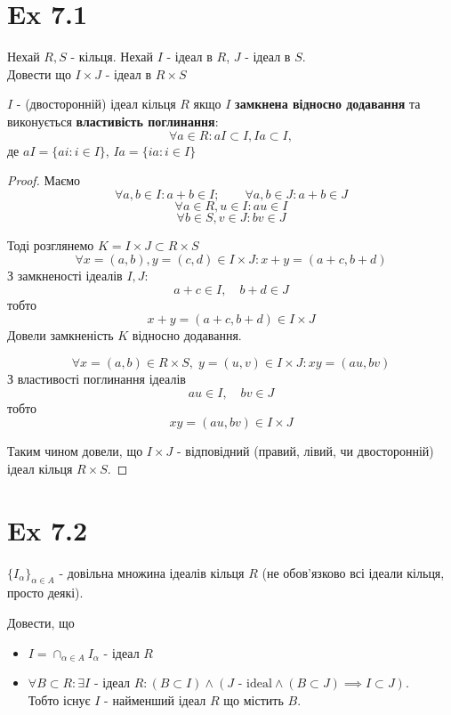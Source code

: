 \documentclass[11pt, a4paper]{article} %
\begin{document}
\section*{Ex 7.1}
\begin{mdframed}
Нехай $R,S$ - кільця. Нехай $I$ - ідеал в $R$, $J$ - ідеал в $S$.\\
Довести що $I \times J$ - ідеал в $R \times S$
\end{mdframed}

\begin{mdframed}[backgroundcolor=blue!10]
    $I$ - (двосторонній) ідеал кільця $R$ якщо $I$ \textbf{замкнена 
    відносно додавання} та виконується \textbf{властивість поглинання}:
    \[\forall a \in R: aI \subset I, Ia \subset I,\]
    де $aI = \{ai : i\in I\}$, $Ia = \{ia : i\in I\}$
\end{mdframed}

\begin{proof}
    Маємо 
    \[\forall a,b \in I: a+b \in I; \qquad \forall a,b \in J: a+b \in J\]
    \[\forall a\in R, u\in I: au \in I\]
    \[\forall b\in S, v\in J: bv \in J\]

    Тоді розглянемо $K = I \times J \subset R \times S$
    \[\forall x=(a,b),y=(c,d) \in I \times J: x+y = (a+c, b+d)\]
    З замкненості ідеалів $I,J$:
    \[a+c \in I, \quad b+d \in J\]
    тобто
    \[x+y = (a+c, b+d) \in I \times J\]
    Довели замкненість $K$ відносно додавання.

    \[\forall x=(a,b) \in R \times S, \; y=(u,v) \in I \times J: xy = (au, bv)\]
    З властивості поглинання ідеалів
    \[au \in I, \quad bv \in J\]
    тобто
    \[xy = (au, bv) \in I \times J\]

    Таким чином довели, що $I \times J$ - відповідний (правий, лівий, чи двосторонній) ідеал кільця $R \times S$.
\end{proof}

\newpage
\section*{Ex 7.2}
\begin{mdframed}
    $\{I_\alpha\}_{\alpha\in A}$ - довільна множина ідеалів кільця $R$ (не обов'язково всі ідеали кільця, просто деякі).

    Довести, що 
    \begin{itemize}
        \item $I = \cap_{\alpha\in A} I_\alpha$ - ідеал $R$
        \item $\forall B\subset R: \exists I$ - ідеал $R: \left(B \subset I\right) \land \left(J \text{ - ideal} \land (B \subset J) \implies I \subset J\right)$.\\
        Тобто існує $I$ - найменший ідеал $R$ що містить $B$.
    \end{itemize}
\end{mdframed}
\end{document}
